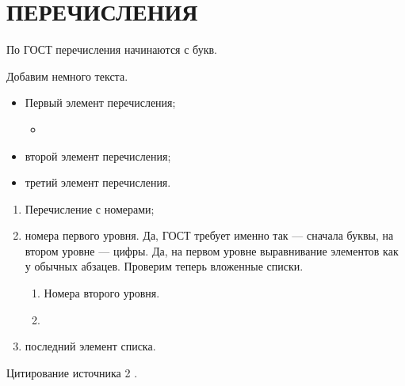 \section{ПЕРЕЧИСЛЕНИЯ}

По ГОСТ перечисления начинаются с букв.

Добавим немного текста. \lipsum[1][1]

\begin{itemize}
    \item Первый элемент перечисления;
    \begin{itemize}
        \item \lipsum[1][1]
    \end{itemize}
    \item второй элемент перечисления;
    \item третий элемент перечисления.
\end{itemize}

\lipsum[1][1]

\begin{enumerate}
    \item Перечисление с номерами;
    \item номера первого уровня. Да, ГОСТ требует именно так --- сначала буквы, 
    на втором уровне --- цифры.
    Да, на первом уровне выравнивание элементов как у обычных абзацев. 
    Проверим теперь вложенные списки.
        \begin{enumerate}
            \item Номера второго уровня.
            \item \lipsum[1][1]
        \end{enumerate}
    \item последний элемент списка.
\end{enumerate}

Цитирование источника 2 \cite{Article3}.

